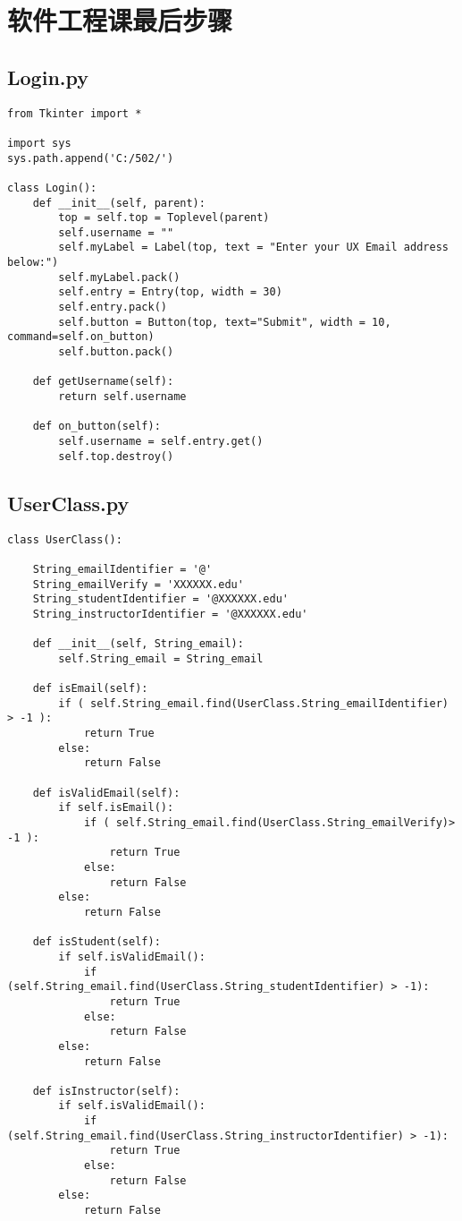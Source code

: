 \documentclass[12pt]{book}
\begin{document}
\chapter{软件工程课最后步骤}
\label{sec-37}

\section{Login.py}
\label{sec-37-1}
\lstset{language=Python,label= ,caption= ,numbers=none}
\begin{lstlisting}
from Tkinter import *

import sys
sys.path.append('C:/502/')

class Login():
    def __init__(self, parent):
        top = self.top = Toplevel(parent)
        self.username = ""
        self.myLabel = Label(top, text = "Enter your UX Email address below:")
        self.myLabel.pack()
        self.entry = Entry(top, width = 30)
        self.entry.pack()
        self.button = Button(top, text="Submit", width = 10, command=self.on_button)
        self.button.pack()

    def getUsername(self):
        return self.username

    def on_button(self):
        self.username = self.entry.get()
        self.top.destroy()
\end{lstlisting}

\section{UserClass.py}
\label{sec-37-2}
\lstset{language=Python,label= ,caption= ,numbers=none}
\begin{lstlisting}
class UserClass():

    String_emailIdentifier = '@'
    String_emailVerify = 'XXXXXX.edu'
    String_studentIdentifier = '@XXXXXX.edu'
    String_instructorIdentifier = '@XXXXXX.edu'

    def __init__(self, String_email):
        self.String_email = String_email

    def isEmail(self):
        if ( self.String_email.find(UserClass.String_emailIdentifier) > -1 ):
            return True
        else:
            return False

    def isValidEmail(self):
        if self.isEmail():
            if ( self.String_email.find(UserClass.String_emailVerify)> -1 ):
                return True
            else:
                return False
        else:
            return False

    def isStudent(self):
        if self.isValidEmail():
            if (self.String_email.find(UserClass.String_studentIdentifier) > -1):
                return True
            else:
                return False
        else:
            return False

    def isInstructor(self):
        if self.isValidEmail():
            if (self.String_email.find(UserClass.String_instructorIdentifier) > -1):
                return True
            else:
                return False
        else:
            return False
\end{lstlisting}
\end{document}

